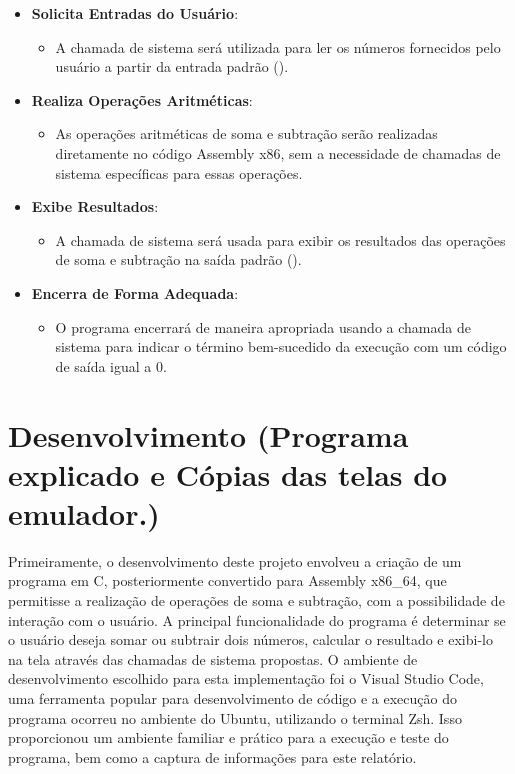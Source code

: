 \documentclass[
	12pt,				%
	openright,			%
	oneside,			%
	a4paper,			%
	chapter=TITLE,		%
	english,			%
	french,				%
	spanish,			%
	brazil				%
	]{abntex2}
\theoremstyle{definition}
\begin{document}
\begin{itemize}
	\item \textbf{Solicita Entradas do Usuário}:
	  \begin{itemize}
		\item A chamada de sistema  será utilizada para ler os números fornecidos pelo usuário a partir 
		da entrada padrão ().
	  \end{itemize}
	\item \textbf{Realiza Operações Aritméticas}:
	  \begin{itemize}
		\item As operações aritméticas de soma e subtração serão realizadas diretamente no código Assembly 
		x86, sem a necessidade de chamadas de sistema específicas para essas operações.
	  \end{itemize}
	\item \textbf{Exibe Resultados}:
	  \begin{itemize}
		\item A chamada de sistema  será usada para exibir os resultados das operações de 
		soma e subtração na saída padrão ().
	  \end{itemize}
	\item \textbf{Encerra de Forma Adequada}:
	  \begin{itemize}
		\item O programa encerrará de maneira apropriada usando a chamada de sistema  para 
		indicar o término bem-sucedido da execução com um código de saída igual a 0.
	  \end{itemize}
  \end{itemize}
  

\chapter{Desenvolvimento (Programa explicado e Cópias das telas do emulador.)}

Primeiramente, o desenvolvimento deste projeto envolveu a criação de um programa em C, 
posteriormente convertido para Assembly x86\_64,  que
permitisse a realização de operações de soma e subtração, com a possibilidade de interação 
com o usuário. A principal funcionalidade do programa é determinar se o usuário deseja somar
ou subtrair dois números, calcular o resultado e exibi-lo na tela através das chamadas de sistema propostas. 
O ambiente de desenvolvimento escolhido para esta implementação foi o Visual Studio Code, uma ferramenta popular para 
desenvolvimento de código e a execução do programa ocorreu no ambiente do Ubuntu, utilizando o
terminal Zsh. Isso proporcionou um ambiente familiar e prático para a execução e teste do programa, 
bem como a captura de informações para este relatório.
\end{document}

